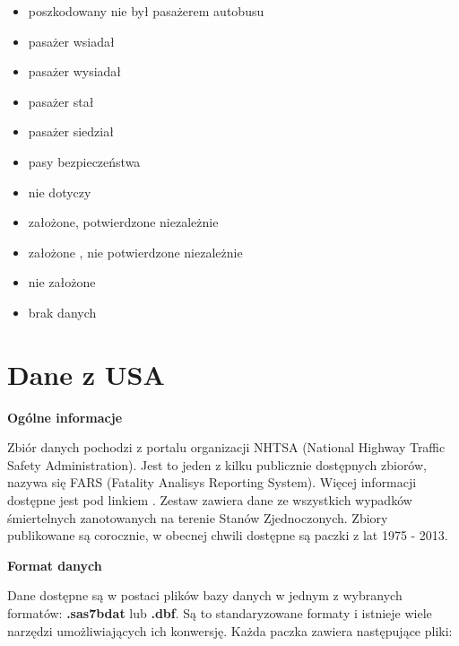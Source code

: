 \begin{itemize}
\item
  poszkodowany nie był pasażerem autobusu\\
\item
  pasażer wsiadał\\
\item
  pasażer wysiadał\\
\item
  pasażer stał\\
\item
  pasażer siedział\\
\item
  pasy bezpieczeństwa\\
\item
  nie dotyczy\\
\item
  założone, potwierdzone niezależnie\\
\item
  założone , nie potwierdzone niezależnie\\
\item
  nie założone\\
\item
  brak danych
\end{itemize}

\section{Dane z USA}\label{dane-z-usa}

\textbf{Ogólne informacje}

Zbiór danych pochodzi z portalu organizacji NHTSA (National Highway
Traffic Safety Administration). Jest to jeden z kilku publicznie
dostępnych zbiorów, nazywa się FARS (Fatality Analisys Reporting
System). Więcej informacji dostępne jest pod linkiem \cite{fars}.
Zestaw zawiera dane ze wszystkich wypadków śmiertelnych zanotowanych na
terenie Stanów Zjednoczonych. Zbiory publikowane są corocznie, w obecnej
chwili dostępne są paczki z lat 1975 - 2013.

\textbf{Format danych}

Dane dostępne są w postaci plików bazy danych w jednym z wybranych
formatów: \textbf{.sas7bdat} lub \textbf{.dbf}. Są to standaryzowane
formaty i istnieje wiele narzędzi umożliwiających ich konwersję. Każda
paczka zawiera następujące pliki:

